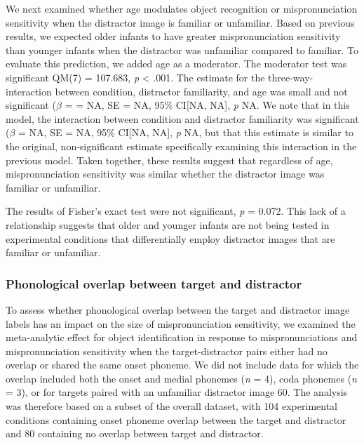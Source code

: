 \documentclass[man]{apa6}
\theoremstyle{definition}
\theoremstyle{definition}
\theoremstyle{definition}
\theoremstyle{remark}
\begin{document}
We next examined whether age modulates object recognition or
mispronunciation sensitivity when the distractor image is familiar or
unfamiliar. Based on previous results, we expected older infants to have
greater mispronunciation sensitivity than younger infants when the
distractor was unfamiliar compared to familiar. To evaluate this
prediction, we added age as a moderator. The moderator test was
significant QM(7) = 107.683, \emph{p} \textless{} .001. The estimate for
the three-way-interaction between condition, distractor familiarity, and
age was small and not significant (\(\beta\) = = NA, SE = NA, 95\%
CI{[}NA, NA{]}, \emph{p} NA. We note that in this model, the interaction
between condition and distractor familiarity was significant (\(\beta\)
= NA, SE = NA, 95\% CI{[}NA, NA{]}, \emph{p} NA, but that this estimate
is similar to the original, non-significant estimate specifically
examining this interaction in the previous model. Taken together, these
results suggest that regardless of age, mispronunciation sensitivity was
similar whether the distractor image was familiar or unfamiliar.

The results of Fisher's exact test were not significant, \emph{p} =
0.072. This lack of a relationship suggests that older and younger
infants are not being tested in experimental conditions that
differentially employ distractor images that are familiar or unfamiliar.

\subsubsection{Phonological overlap between target and
distractor}\label{phonological-overlap-between-target-and-distractor}

To assess whether phonological overlap between the target and distractor
image labels has an impact on the size of mispronunciation sensitivity,
we examined the meta-analytic effect for object identification in
response to mispronunciations and mispronunciation sensitivity when the
target-distractor pairs either had no overlap or shared the same onset
phoneme. We did not include data for which the overlap included both the
onset and medial phonemes (\emph{n} = 4), coda phonemes (\emph{n} = 3),
or for targets paired with an unfamiliar distractor image 60. The
analysis was therefore based on a subset of the overall dataset, with
104 experimental conditions containing onset phoneme overlap between the
target and distractor and 80 containing no overlap between target and
distractor.
\end{document}
